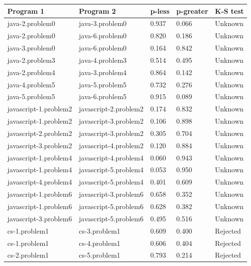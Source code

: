 \begin{appendices}
\begin{table}[h]
\centering
\small
\begin{adjustbox}{height=0.5\textheight}
\begin{tabular}{|l|l|l|l|l|}
\hline
Program 1 & Program 2 & p-less & p-greater & K-S test\\ \hline
java-2.problem0 & java-3.problem0 & 0.937 & 0.066 & Unknown\\ \hline
java-2.problem0 & java-6.problem0 & 0.820 & 0.186 & Unknown\\ \hline
java-3.problem0 & java-6.problem0 & 0.164 & 0.842 & Unknown\\ \hline
java-2.problem3 & java-4.problem3 & 0.514 & 0.495 & Unknown\\ \hline
java-2.problem4 & java-3.problem4 & 0.864 & 0.142 & Unknown\\ \hline
java-4.problem5 & java-5.problem5 & 0.732 & 0.276 & Unknown\\ \hline
java-5.problem5 & java-6.problem5 & 0.915 & 0.089 & Unknown\\ \hline
javascript-1.problem2 & javascript-2.problem2 & 0.174 & 0.832 & Unknown \\ \hline
javascript-1.problem2 & javascript-3.problem2 & 0.106 & 0.898 & Unknown\\ \hline
javascript-2.problem2 & javascript-3.problem2 & 0.305 & 0.704 & Unknown\\ \hline
javascript-3.problem2 & javascript-4.problem2 & 0.120 & 0.884 & Unknown\\ \hline
javascript-1.problem4 & javascript-4.problem4 & 0.060 & 0.943 & Unknown\\ \hline
javascript-1.problem4 & javascript-5.problem4 & 0.053 & 0.950 & Unknown\\ \hline
javascript-4.problem4 & javascript-5.problem4 & 0.401 & 0.609 & Unknown\\ \hline
javascript-1.problem6 & javascript-3.problem6 & 0.658 & 0.352 & Unknown\\ \hline
javascript-1.problem6 & javascript-5.problem6 & 0.628 & 0.382 & Unknown\\ \hline
javascript-3.problem6 & javascript-5.problem6 & 0.495 & 0.516 & Unknown\\ \hline
cs-1.problem1 & cs-3.problem1 & 0.609 & 0.400 & Rejected\\ \hline
cs-1.problem1 & cs-4.problem1 & 0.606 & 0.404 & Rejected\\ \hline
cs-2.problem1 & cs-5.problem1 & 0.793 & 0.214 & Rejected\\ \hline

\end{tabular}
\end{adjustbox}
\end{table}
\end{appendices}
